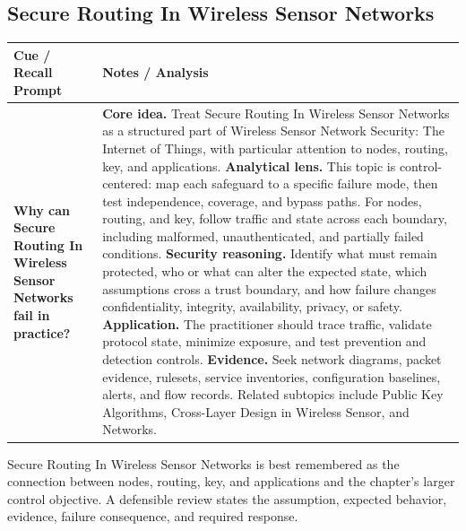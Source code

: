 \documentclass[11pt]{article}
\newcommand{\CornellHeader}{%
\rowcolor{Navy}\color{white}\bfseries Cue / Recall Prompt & \color{white}\bfseries Notes / Analysis\\\hline}
\newcommand{\CornellRow}[2]{%
\cellcolor{CueGray}\RaggedRight\textbf{#1} & \RaggedRight #2\\\hline}
\begin{document}
\subsection*{Secure Routing In Wireless Sensor Networks}
\begin{longtable}{>{\RaggedRight\arraybackslash}p{}|>{\RaggedRight\arraybackslash}p{}}
\CornellHeader
\CornellRow{Why can Secure Routing In Wireless Sensor Networks fail in practice?}{\textbf{Core idea.} Treat Secure Routing In Wireless Sensor Networks as a structured part of Wireless Sensor Network Security: The Internet of Things, with particular attention to nodes, routing, key, and applications. \textbf{Analytical lens.} This topic is control-centered: map each safeguard to a specific failure mode, then test independence, coverage, and bypass paths. For nodes, routing, and key, follow traffic and state across each boundary, including malformed, unauthenticated, and partially failed conditions. \textbf{Security reasoning.} Identify what must remain protected, who or what can alter the expected state, which assumptions cross a trust boundary, and how failure changes confidentiality, integrity, availability, privacy, or safety. \textbf{Application.} The practitioner should trace traffic, validate protocol state, minimize exposure, and test prevention and detection controls. \textbf{Evidence.} Seek network diagrams, packet evidence, rulesets, service inventories, configuration baselines, alerts, and flow records. Related subtopics include Public Key Algorithms, Cross-Layer Design in Wireless Sensor, and Networks.}
\end{longtable}
\begin{topicsummary}
Secure Routing In Wireless Sensor Networks is best remembered as the connection between nodes, routing, key, and applications and the chapter's larger control objective. A defensible review states the assumption, expected behavior, evidence, failure consequence, and required response.
\end{topicsummary}
\end{document}
